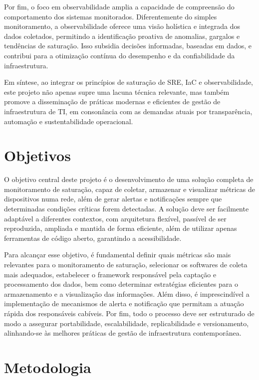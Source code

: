 Por fim, o foco em observabilidade amplia a capacidade de compreensão do comportamento dos sistemas monitorados. Diferentemente do simples monitoramento, a observabilidade oferece uma visão holística e integrada dos dados coletados, permitindo a identificação proativa de anomalias, gargalos e tendências de saturação. Isso subsidia decisões informadas, baseadas em dados, e contribui para a otimização contínua do desempenho e da confiabilidade da infraestrutura.

Em síntese, ao integrar os princípios de saturação de SRE, IaC e observabilidade, este projeto não apenas supre uma lacuna técnica relevante, mas também promove a disseminação de práticas modernas e eficientes de gestão de infraestrutura de TI, em consonância com as demandas atuais por transparência, automação e sustentabilidade operacional.

\section{Objetivos}
\label{section:Objetivos}

O objetivo central deste projeto é o desenvolvimento de uma solução completa de monitoramento de saturação, capaz de coletar, armazenar e visualizar métricas de dispositivos numa rede, além de gerar alertas e notificações sempre que determinadas condições críticas forem detectadas. A solução deve ser facilmente adaptável a diferentes contextos, com arquitetura flexível, passível de ser reproduzida, ampliada e mantida de forma eficiente, além de utilizar apenas ferramentas de código aberto, garantindo a acessibilidade.

Para alcançar esse objetivo, é fundamental definir quais métricas são mais relevantes para o monitoramento de saturação, selecionar os softwares de coleta mais adequados, estabelecer o framework responsável pela captação e processamento dos dados, bem como determinar estratégias eficientes para o armazenamento e a visualização das informações. Além disso, é imprescindível a implementação de mecanismos de alerta e notificação que permitam a atuação rápida dos responsáveis cabíveis. Por fim, todo o processo deve ser estruturado de modo a assegurar portabilidade, escalabilidade, replicabilidade e versionamento, alinhando-se às melhores práticas de gestão de infraestrutura contemporânea.

\section{Metodologia}


